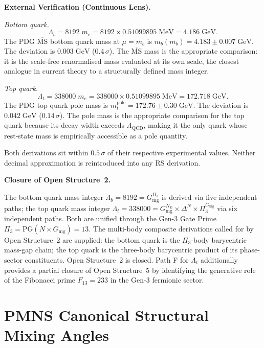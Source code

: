 \documentclass[11pt, letterpaper]{article}
\theoremstyle{definition}
\theoremstyle{plain}
\begin{document}
\begin{verifybox}
\textbf{External Verification (Continuous Lens).}

\textit{Bottom quark.}
\[
    \Lambda_b = 8192 \; m_e = 8192 \times 0.51099895\;\mathrm{MeV} = 4.186\;\mathrm{GeV}.
\]
The PDG $\overline{\mathrm{MS}}$ bottom quark mass at $\mu = m_b$ is
$m_b(m_b) = 4.183 \pm 0.007\;\mathrm{GeV}$. The deviation is $0.003\;\mathrm{GeV}$
($0.4\,\sigma$). The $\overline{\mathrm{MS}}$ mass is the appropriate comparison:
it is the scale-free renormalised mass evaluated at its own scale, the closest
analogue in current theory to a structurally defined mass integer.

\textit{Top quark.}
\[
    \Lambda_t = 338000 \; m_e = 338000 \times 0.51099895\;\mathrm{MeV} = 172.718\;\mathrm{GeV}.
\]
The PDG top quark pole mass is $m_t^\mathrm{pole} = 172.76 \pm 0.30\;\mathrm{GeV}$.
The deviation is $0.042\;\mathrm{GeV}$ ($0.14\,\sigma$). The pole mass is the
appropriate comparison for the top quark because its decay width exceeds
$\Lambda_\mathrm{QCD}$, making it the only quark whose rest-state mass is
empirically accessible as a pole quantity.

Both derivations sit within $0.5\,\sigma$ of their respective experimental values.
Neither decimal approximation is reintroduced into any RS derivation.
\end{verifybox}

\begin{rsbox}
\textbf{Closure of Open Structure~2.}

The bottom quark mass integer $\Lambda_b = 8192 = G_\mathrm{mg}^{\Pi_3}$ is derived
via five independent paths; the top quark mass integer $\Lambda_t = 338000 =
G_\mathrm{mg}^{N_E} \times \Delta^N \times \Pi_3^{G_\mathrm{mg}}$ via six independent
paths. Both are unified through the Gen-3 Gate Prime $\Pi_3 = \mathrm{PG}(N \times G_\mathrm{mg})
= 13$. The multi-body composite derivations called for by Open Structure~2 are supplied:
the bottom quark is the $\Pi_3$-body barycentric mass-gap chain; the top quark is the
three-body barycentric product of its phase-sector constituents. Open Structure~2 is
closed. Path F for $\Lambda_t$ additionally provides a partial closure of Open Structure~5
by identifying the generative role of the Fibonacci prime $F_{13} = 233$ in the
Gen-3 fermionic sector.
\end{rsbox}



\section{PMNS Canonical Structural Mixing Angles}\label{sec:dressing}
\end{document}
